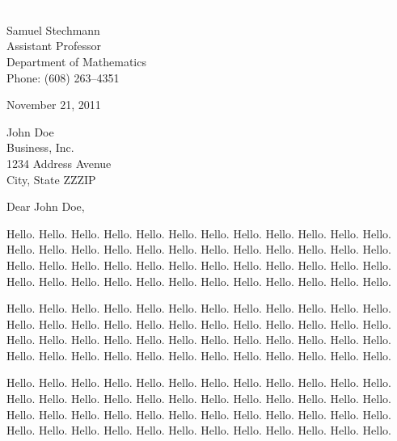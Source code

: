 \documentclass[11pt]{article}
\begin{document}
\section*{}

\noindent
\begin{minipage}{0.99\textwidth}
\begin{minipage}{0.69\textwidth}
\textcolor{white}{.}
\end{minipage}
\begin{minipage}{0.29\textwidth}
{\footnotesize
Samuel Stechmann \\
Assistant Professor \\
Department of Mathematics \\
Phone: (608) 263--4351 
}

\vspace{12pt}
November 21, 2011
\end{minipage}
\end{minipage}

\vspace{12pt}
\noindent
John Doe \\
Business, Inc. \\
1234 Address Avenue \\
City, State ZZZIP

\vspace{12pt}
\noindent
Dear John Doe,

\vspace{12pt}
Hello. Hello. Hello. Hello. Hello. Hello. Hello. Hello.
Hello. Hello. Hello. Hello. Hello. Hello. Hello. Hello.
Hello. Hello. Hello. Hello. Hello. Hello. Hello. Hello.
Hello. Hello. Hello. Hello. Hello. Hello. Hello. Hello.
Hello. Hello. Hello. Hello. Hello. Hello. Hello. Hello.
Hello. Hello. Hello. Hello. Hello. Hello. Hello. Hello.

\vspace{12pt}
Hello. Hello. Hello. Hello. Hello. Hello. Hello. Hello.
Hello. Hello. Hello. Hello. Hello. Hello. Hello. Hello.
Hello. Hello. Hello. Hello. Hello. Hello. Hello. Hello.
Hello. Hello. Hello. Hello. Hello. Hello. Hello. Hello.
Hello. Hello. Hello. Hello. Hello. Hello. Hello. Hello.
Hello. Hello. Hello. Hello. Hello. Hello. Hello. Hello.

\vspace{12pt}
Hello. Hello. Hello. Hello. Hello. Hello. Hello. Hello.
Hello. Hello. Hello. Hello. Hello. Hello. Hello. Hello.
Hello. Hello. Hello. Hello. Hello. Hello. Hello. Hello.
Hello. Hello. Hello. Hello. Hello. Hello. Hello. Hello.
Hello. Hello. Hello. Hello. Hello. Hello. Hello. Hello.
Hello. Hello. Hello. Hello. Hello. Hello. Hello. Hello.
\end{document}
